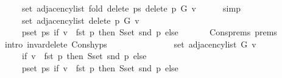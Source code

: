 \begin{isabellebody}
\ \ \ \ \ set\ {\isacharparenleft}{\kern0pt}adjacency{\isacharunderscore}{\kern0pt}list\ {\isacharparenleft}{\kern0pt}fold\ delete{\isacharunderscore}{\kern0pt}{}\ ps\ {\isacharparenleft}{\kern0pt}delete{\isacharunderscore}{\kern0pt}{}\ p\ G{\isacharparenright}{\kern0pt}{\isacharparenright}{\kern0pt}\ v{\isacharparenright}{\kern0pt}{\isachardoublequoteclose}\isanewline
\ \ \ \ \isamarkupfalse%
\ simp\isanewline
\ \ \isamarkupfalse%
\ \isamarkupfalse%
\isanewline
\ \ \ \ {\isachardoublequoteopen}{\isachardot}{\kern0pt}{\isachardot}{\kern0pt}{\isachardot}{\kern0pt}\ {\isacharequal}{\kern0pt}\isanewline
\ \ \ \ \ set\ {\isacharparenleft}{\kern0pt}adjacency{\isacharunderscore}{\kern0pt}list\ {\isacharparenleft}{\kern0pt}delete{\isacharunderscore}{\kern0pt}{}\ p\ G{\isacharparenright}{\kern0pt}\ v{\isacharparenright}{\kern0pt}\ {\isacharminus}{\kern0pt}\isanewline
\ \ \ \ \ {\isacharparenleft}{\kern0pt}{\isasymUnion}p{\isasymin}set\ ps{\isachardot}{\kern0pt}\ if\ v\ {\isacharequal}{\kern0pt}\ fst\ p\ then\ S{\isachardot}{\kern0pt}set\ {\isacharparenleft}{\kern0pt}snd\ p{\isacharparenright}{\kern0pt}\ else\ {\isacharbraceleft}{\kern0pt}{\isacharbraceright}{\kern0pt}{\isacharparenright}{\kern0pt}{\isachardoublequoteclose}\isanewline
\ \ \ \ \isamarkupfalse%
\ Cons{\isachardot}{\kern0pt}prems{\isacharparenleft}{\kern0pt}{}{\isacharparenright}{\kern0pt}\ prems\isanewline
\ \ \ \ \isamarkupfalse%
\ {\isacharparenleft}{\kern0pt}intro\ invar{\isacharunderscore}{\kern0pt}delete{\isacharunderscore}{\kern0pt}{}\ Cons{\isachardot}{\kern0pt}hyps{\isacharparenright}{\kern0pt}\isanewline
\ \ \isamarkupfalse%
\ \isamarkupfalse%
\isanewline
\ \ \ \ {\isachardoublequoteopen}{\isachardot}{\kern0pt}{\isachardot}{\kern0pt}{\isachardot}{\kern0pt}\ {\isacharequal}{\kern0pt}\isanewline
\ \ \ \ \ set\ {\isacharparenleft}{\kern0pt}adjacency{\isacharunderscore}{\kern0pt}list\ G\ v{\isacharparenright}{\kern0pt}\ {\isacharminus}{\kern0pt}\isanewline
\ \ \ \ \ {\isacharparenleft}{\kern0pt}if\ v\ {\isacharequal}{\kern0pt}\ fst\ p\ then\ S{\isachardot}{\kern0pt}set\ {\isacharparenleft}{\kern0pt}snd\ p{\isacharparenright}{\kern0pt}\ else\ {\isacharbraceleft}{\kern0pt}{\isacharbraceright}{\kern0pt}{\isacharparenright}{\kern0pt}\ {\isacharminus}{\kern0pt}\isanewline
\ \ \ \ \ {\isacharparenleft}{\kern0pt}{\isasymUnion}p{\isasymin}set\ ps{\isachardot}{\kern0pt}\ if\ v\ {\isacharequal}{\kern0pt}\ fst\ p\ then\ S{\isachardot}{\kern0pt}set\ {\isacharparenleft}{\kern0pt}snd\ p{\isacharparenright}{\kern0pt}\ else\ {\isacharbraceleft}{\kern0pt}{\isacharbraceright}{\kern0pt}{\isacharparenright}{\kern0pt}{\isachardoublequoteclose}\isanewline

\end{isabellebody}
